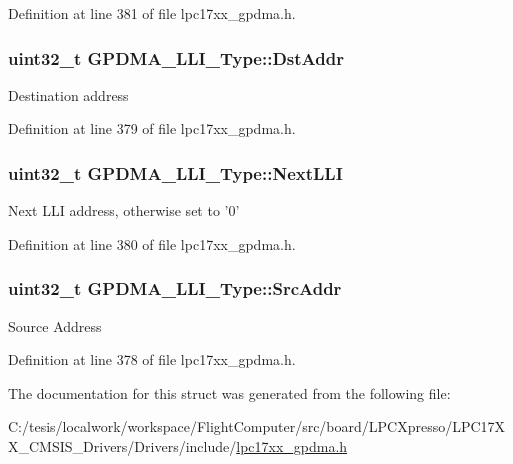 \-Definition at line 381 of file lpc17xx\-\_\-gpdma.\-h.

\hypertarget{struct_g_p_d_m_a___l_l_i___type_adf0fc4f04316deba134de095b80afce5}{
\subsubsection[{\-Dst\-Addr}]{\setlength{\rightskip}{0pt plus 5cm}uint32\-\_\-t {\bf \-G\-P\-D\-M\-A\-\_\-\-L\-L\-I\-\_\-\-Type\-::\-Dst\-Addr}}}\label{struct_g_p_d_m_a___l_l_i___type_adf0fc4f04316deba134de095b80afce5}
\-Destination address 

\-Definition at line 379 of file lpc17xx\-\_\-gpdma.\-h.

\hypertarget{struct_g_p_d_m_a___l_l_i___type_ad21cd897bd9cb7fbd1e20df097a903aa}{
\subsubsection[{\-Next\-L\-L\-I}]{\setlength{\rightskip}{0pt plus 5cm}uint32\-\_\-t {\bf \-G\-P\-D\-M\-A\-\_\-\-L\-L\-I\-\_\-\-Type\-::\-Next\-L\-L\-I}}}\label{struct_g_p_d_m_a___l_l_i___type_ad21cd897bd9cb7fbd1e20df097a903aa}
\-Next \-L\-L\-I address, otherwise set to '0' 

\-Definition at line 380 of file lpc17xx\-\_\-gpdma.\-h.

\hypertarget{struct_g_p_d_m_a___l_l_i___type_a9c581d9916dfc4f2cd74981faf167225}{
\subsubsection[{\-Src\-Addr}]{\setlength{\rightskip}{0pt plus 5cm}uint32\-\_\-t {\bf \-G\-P\-D\-M\-A\-\_\-\-L\-L\-I\-\_\-\-Type\-::\-Src\-Addr}}}\label{struct_g_p_d_m_a___l_l_i___type_a9c581d9916dfc4f2cd74981faf167225}
\-Source \-Address 

\-Definition at line 378 of file lpc17xx\-\_\-gpdma.\-h.



\-The documentation for this struct was generated from the following file\-:\begin{DoxyCompactItemize}
\item 
\-C\-:/tesis/localwork/workspace/\-Flight\-Computer/src/board/\-L\-P\-C\-Xpresso/\-L\-P\-C17\-X\-X\-\_\-\-C\-M\-S\-I\-S\-\_\-\-Drivers/\-Drivers/include/\hyperlink{lpc17xx__gpdma_8h}{lpc17xx\-\_\-gpdma.\-h}\end{DoxyCompactItemize}
